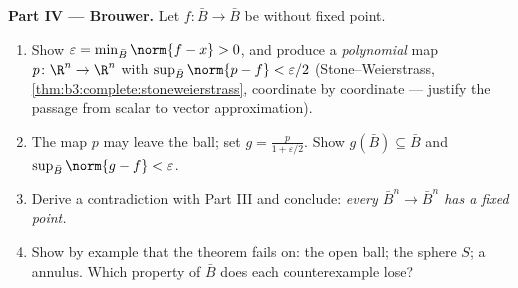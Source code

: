 \begin{problem}
\medskip
\noindent\textbf{Part IV ---  Brouwer.} Let
$f\colon\bar B\to\bar B$ be  without fixed point.
\begin{enumerate}[resume]
  \item Show $\varepsilon = \min_{\bar B}\norm{f - x} > 0$,
        and produce a \emph{polynomial} map $p\colon\R^n\to
        \R^n$ with $\sup_{\bar B}\norm{p - f} <
        \varepsilon/2$ (Stone--Weierstrass,
        \cref{thm:b3:complete:stoneweierstrass}, coordinate
        by coordinate --- justify the passage from scalar to
        vector approximation).
  \item The map $p$ may leave the ball; set $g = \frac{p}{1
        + \varepsilon/2}$. Show $g(\bar B) \subseteq \bar B$
        and $\sup_{\bar B}\norm{g - f} < \varepsilon$.
  \item Derive a contradiction with Part III and conclude:
        \emph{every  $\bar B^n \to \bar B^n$
        has a fixed point.}
  \item Show by example that the theorem fails on: the open
        ball; the sphere $S$; a  annulus. Which
        property of $\bar B$ does each counterexample lose?
\end{enumerate}


\end{problem}
